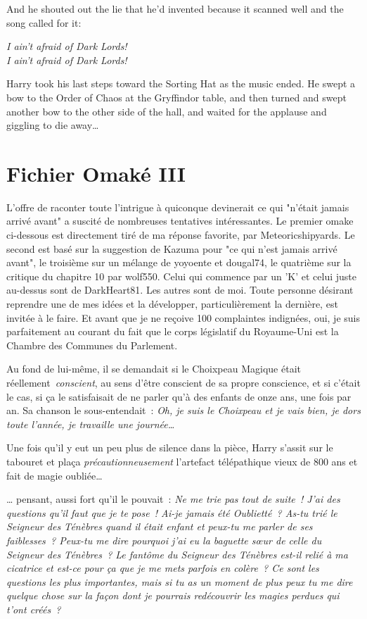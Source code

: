 And he shouted out the lie that he’d invented because it scanned well and the song called for it:

\begin{center}
\emph{I ain’t afraid of Dark Lords!\\
I ain’t afraid of Dark Lords!}
\end{center}

Harry took his last steps toward the Sorting Hat as the music ended. He swept a bow to the Order of Chaos at the Gryffindor table, and then turned and swept another bow to the other side of the hall, and waited for the applause and giggling to die away…

\section{Fichier Omaké III}

L'offre de raconter toute l'intrigue à quiconque devinerait ce qui "n'était jamais arrivé avant" a suscité de nombreuses tentatives intéressantes. Le premier omake ci-dessous est directement tiré de ma réponse favorite, par Meteoricshipyards. Le second est basé sur la suggestion de Kazuma pour "ce qui n'est jamais arrivé avant", le troisième sur un mélange de yoyoente et dougal74, le quatrième sur la critique du chapitre 10 par wolf550. Celui qui commence par un 'K' et celui juste au-dessus sont de DarkHeart81. Les autres sont de moi. Toute personne désirant reprendre une de mes idées et la développer, particulièrement la dernière, est invitée à le faire. Et avant que je ne reçoive 100 complaintes indignées, oui, je suis parfaitement au courant du fait que le corps législatif du Royaume-Uni est la Chambre des Communes du Parlement.

\later

Au fond de lui-même, il se demandait si le Choixpeau Magique était réellement~\emph{conscient}, au sens d'être conscient de sa propre conscience, et si c'était le cas, si ça le satisfaisait de ne parler qu'à des enfants de onze ans, une fois par an. Sa chanson le sous-entendait~: \emph{Oh, je suis le Choixpeau et je vais bien, je dors toute l'année, je travaille une journée…}

Une fois qu'il y eut un peu plus de silence dans la pièce, Harry s'assit sur le tabouret et plaça \emph{précautionneusement} l'artefact télépathique vieux de 800 ans et fait de magie oubliée…

… pensant, aussi fort qu'il le pouvait~: \emph{Ne me trie pas tout de suite~! J'ai des questions qu'il faut que je te pose~! Ai-je jamais été Oublietté~? As-tu trié le Seigneur des Ténèbres quand il était enfant et peux-tu me parler de ses faiblesses~? Peux-tu me dire pourquoi j'ai eu la baguette sœur de celle du Seigneur des Ténèbres~? Le fantôme du Seigneur des Ténèbres est-il relié à ma cicatrice et est-ce pour ça que je me mets parfois en colère~? Ce sont les questions les plus importantes, mais si tu as un moment de plus peux tu me dire quelque chose sur la façon dont je pourrais redécouvrir les magies perdues qui t'ont créés~?}

